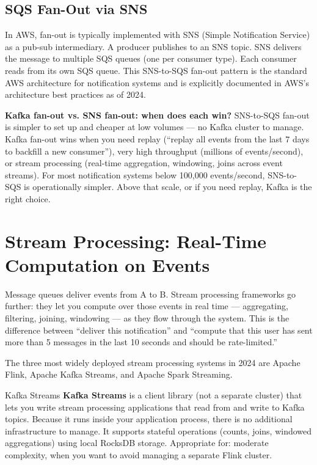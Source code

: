 \documentclass[11pt,a4paper]{article}
\begin{document}
\subsection{SQS Fan-Out via SNS}

In AWS, fan-out is typically implemented with SNS (Simple Notification Service) as a pub-sub intermediary. A producer publishes to an SNS topic. SNS delivers the message to multiple SQS queues (one per consumer type). Each consumer reads from its own SQS queue. This SNS-to-SQS fan-out pattern is the standard AWS architecture for notification systems and is explicitly documented in AWS's architecture best practices as of 2024.

\begin{thinkbox}
\textbf{Kafka fan-out vs. SNS fan-out: when does each win?} SNS-to-SQS fan-out is simpler to set up and cheaper at low volumes --- no Kafka cluster to manage. Kafka fan-out wins when you need replay (``replay all events from the last 7 days to backfill a new consumer''), very high throughput (millions of events/second), or stream processing (real-time aggregation, windowing, joins across event streams). For most notification systems below 100,000 events/second, SNS-to-SQS is operationally simpler. Above that scale, or if you need replay, Kafka is the right choice.
\end{thinkbox}

\section{Stream Processing: Real-Time Computation on Events}

Message queues deliver events from A to B. Stream processing frameworks go further: they let you compute over those events in real time --- aggregating, filtering, joining, windowing --- as they flow through the system. This is the difference between ``deliver this notification'' and ``compute that this user has sent more than 5 messages in the last 10 seconds and should be rate-limited.''

The three most widely deployed stream processing systems in 2024 are Apache Flink, Apache Kafka Streams, and Apache Spark Streaming.

\begin{termbox}{Kafka Streams}
\textbf{Kafka Streams} is a client library (not a separate cluster) that lets you write stream processing applications that read from and write to Kafka topics. Because it runs inside your application process, there is no additional infrastructure to manage. It supports stateful operations (counts, joins, windowed aggregations) using local RocksDB storage. Appropriate for: moderate complexity, when you want to avoid managing a separate Flink cluster.
\end{termbox}
\end{document}
